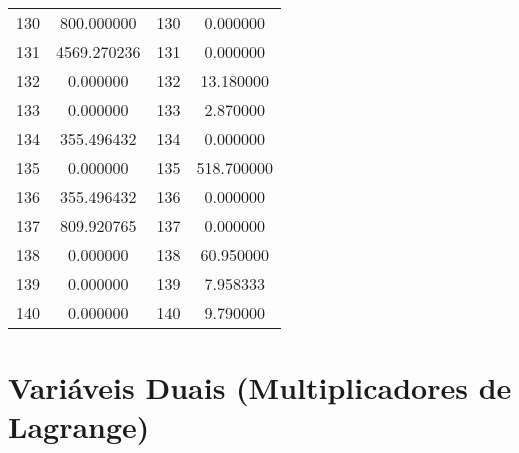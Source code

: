 \documentclass[12pt]{article}
\begin{document}
\begin{longtable}{@{}cccc@{}}
130 & 800.000000 & 130 & 0.000000 \\
131 & 4569.270236 & 131 & 0.000000 \\
132 & 0.000000 & 132 & 13.180000 \\
133 & 0.000000 & 133 & 2.870000 \\
134 & 355.496432 & 134 & 0.000000 \\
135 & 0.000000 & 135 & 518.700000 \\
136 & 355.496432 & 136 & 0.000000 \\
137 & 809.920765 & 137 & 0.000000 \\
138 & 0.000000 & 138 & 60.950000 \\
139 & 0.000000 & 139 & 7.958333 \\
140 & 0.000000 & 140 & 9.790000 \\

\end{longtable}

\section{Variáveis Duais (Multiplicadores de Lagrange)}
\end{document}
